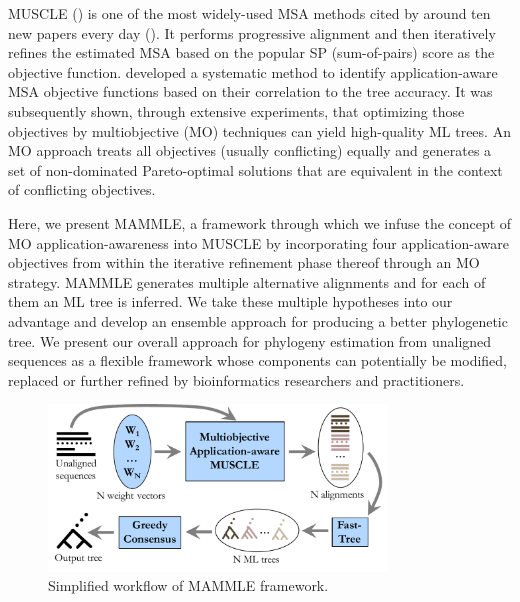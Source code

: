 MUSCLE (\cite{edgar2004muscle}) is one of the most widely-used MSA methods cited by around ten new papers every day (\cite{muscle-web}). It performs progressive alignment and then iteratively refines the estimated MSA based on the popular SP (sum-of-pairs) score as the objective function. \cite{nayeem2020multiobjective} developed a systematic method to identify application-aware MSA objective functions based on their correlation to the tree accuracy. It was subsequently shown, through extensive experiments, that optimizing those objectives by multiobjective (MO) techniques can yield high-quality ML trees. An MO approach treats all objectives (usually conflicting) equally and generates a set of non-dominated Pareto-optimal solutions that are equivalent in the context of conflicting objectives. 

Here, we present MAMMLE, a framework through which we infuse the concept of MO application-awareness into MUSCLE by incorporating four application-aware objectives from \cite{nayeem2020multiobjective} within the iterative refinement phase thereof through an MO strategy. MAMMLE generates multiple alternative alignments and for each of them an ML tree is inferred. We take these multiple hypotheses into our advantage and develop an ensemble approach for producing a better phylogenetic tree. We present our overall approach for phylogeny estimation from unaligned sequences as a flexible framework whose components can potentially be modified, replaced or further refined by bioinformatics researchers and practitioners.

\begin{figure}[!htbp]
	\centering
	\includegraphics[width=0.8\textwidth]{Figure/workflow.pdf}
	\caption{Simplified workflow of MAMMLE framework.}
	\label{fig:workflow}
\end{figure}

